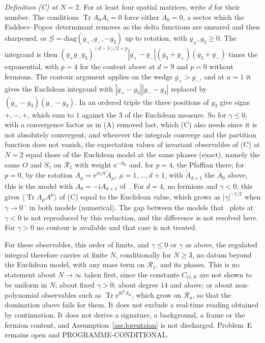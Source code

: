 \emph{Definition (C) at \(N=2\).} For at least four spatial matrices, write \(d\) for their number. The conditions \(\operatorname{Tr}A_0A_i=0\) force either \(A_0=0\), a sector which the Faddeev--Popov determinant removes as the delta functions are smeared and then sharpened, or \(\mathcal G=\mathrm{diag}(g_+,g_-,-g_3)\) up to rotation, with \(g_\pm,g_3\ge0\). The integrand is then \((g_+g_-g_3)^{(d-3)/2+p}|g_+-g_-|(g_3+g_+)(g_3+g_-)\) times the exponential, with \(p=4\) for the content above at \(d=9\) and \(p=0\) without fermions. The contour argument applies on the wedge \(g_+>g_-\), and at \(u=1\) it gives the Euclidean integrand with \(|g_+-g_3||g_--g_3|\) replaced by \((g_+-g_3)(g_--g_3)\). In an ordered triple the three positions of \(g_3\) give signs \(+,-,+\), which sum to \(1\) against the \(3\) of the Euclidean measure. So for \(\gamma\le0\), with a convergence factor as in (A) removed last, which (C) also needs since it is not absolutely convergent, and wherever the integrals converge and the partition function does not vanish, the expectation values of invariant observables of (C) at \(N=2\) equal those of the Euclidean model at the same phases (exact), namely the same \(O\) and \(S_\gamma\) on \(\mathcal R_1\) with weight \(\mathrm e^{-S_{\mathrm E}}\) and, for \(p=4\), the Pfaffian there; for \(p=0\), by the rotation \(A_\mu=\mathrm e^{\pi\mathrm i/8}\tilde A_\mu\), \(\mu=1,\dots,d+1\), with \(\tilde A_{d+1}\) the \(\tilde A_0\) above, this is the model with \(A_0=-\mathrm iA_{d+1}\) of~\cite{ChouNishimuraTripathi2025}. For \(d=4\), no fermions and \(\gamma<0\), this gives \(\langle\operatorname{Tr}A_\mu A^\mu\rangle\) of (C) equal to the Euclidean value, which grows as \(|\gamma|^{-1/2}\) when \(\gamma\to0^-\) in both models (numerical). The gap between the models that~\cite{ChouNishimuraTripathi2025} plots at \(\gamma<0\) is not reproduced by this reduction, and the difference is not resolved here. For \(\gamma>0\) no contour is available and that case is not treated.

For these observables, this order of limits, and \(\gamma\le0\) or \(\gamma\) as above, the regulated integral therefore carries at finite \(N\), conditionally for \(N\ge3\), no datum beyond the Euclidean model, with any mass term on \(\mathcal R_1\), and its phases. This is no statement about \(N\to\infty\) taken first, since the constants \(C_{O,N}\) are not shown to be uniform in \(N\); about fixed \(\gamma>0\); about degree \(14\) and above; or about non-polynomial observables such as \(\operatorname{Tr}\mathrm e^{\mathrm ik^\mu A_\mu}\), which grow on \(\mathcal R_u\), so that the domination above fails for them. It does not exclude a real-time reading obtained by continuation. It does not derive a signature, a background, a frame or the fermion content, and Assumption~\ref{ass:lorentzian} is not discharged. Problem~E remains open and PROGRAMME-CONDITIONAL.

